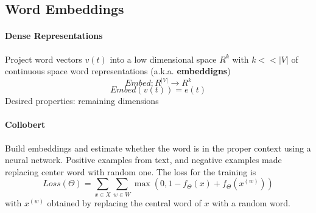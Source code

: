 \documentclass[10pt]{report}
\begin{document}
\subsection{Word Embeddings}
\paragraph{Dense Representations} Project word vectors $v(t)$ into a low dimensional space $R^k$ with $k<<|V|$ of continuous space word representations (a.k.a. \textbf{embeddigns})
$$Embed : R^{|V|}\rightarrow R^k$$
$$Embed(v(t)) = e(t)$$
Desired properties: remaining dimensions %
\paragraph{Collobert} Build embeddings and estimate whether the word is in the proper context using a neural network. Positive examples from text, and negative examples made replacing center word with random one. The loss for the training is $$Loss(\Theta) = \sum_{x\in X}\sum_{w\in W} \max(0, 1-f_\Theta(x) + f_\Theta(x^{(w)}))$$
with $x^{(w)}$ obtained by replacing the central word of $x$ with a random word.
\end{document}
